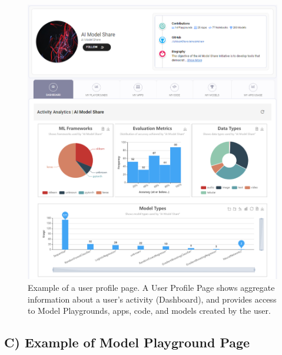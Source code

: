 \begin{figure}[h!]
  \centering
  \includegraphics[width=1\textwidth]{figures/profile_page.png}
  \caption{Example of a user profile page. A User Profile Page shows aggregate information about a user's activity (Dashboard), and provides access to Model Playgrounds, apps, code, and models created by the user.}
\end{figure}

\newpage
\subsection{C) Example of Model Playground Page}
\label{app:playground}

